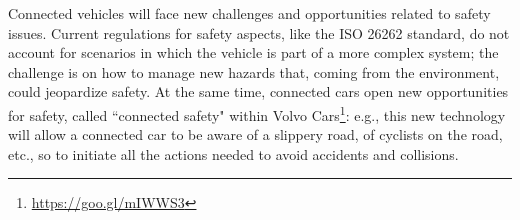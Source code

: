 Connected vehicles will face new challenges and opportunities related to safety issues.
Current %
regulations for safety aspects, like the ISO 26262 standard, do not account for scenarios in which the %
vehicle is part of a more complex system; the challenge is on how to manage new hazards that, coming from the environment, could jeopardize safety. 
At the same time, connected cars open new opportunities for safety, called ``connected safety" within Volvo Cars\footnote{\url{https://goo.gl/mIWWS3}}: %
e.g., this new technology will allow a connected car to be aware of a slippery road, of cyclists on the road, etc., so to initiate all the actions needed to avoid accidents and collisions. 
%

